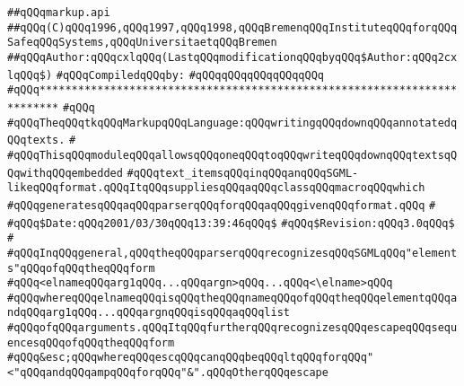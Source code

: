 \label{src/lib/tk/src/toolkit/markup.api}
\verb|##qQQqmarkup.api|\newline
\verb|##qQQq(C)qQQq1996,qQQq1997,qQQq1998,qQQqBremenqQQqInstituteqQQqforqQQqSafeqQQqSystems,qQQqUniversitaetqQQqBremen|\newline
\verb|##qQQqAuthor:qQQqcxlqQQq(LastqQQqmodificationqQQqbyqQQq$Author:qQQq2cxlqQQq$)|\newline
\newline
\verb|#qQQqCompiledqQQqby:|\newline
\verb|#qQQqqQQqqQQqqQQqqQQq|\newline
\newline
\newline
\newline
\newline
\verb|#qQQq*************************************************************************|\newline
\verb|#qQQq|\newline
\verb|#qQQqTheqQQqtkqQQqMarkupqQQqLanguage:qQQqwritingqQQqdownqQQqannotatedqQQqtexts.|\newline
\verb|#|\newline
\verb|#qQQqThisqQQqmoduleqQQqallowsqQQqoneqQQqtoqQQqwriteqQQqdownqQQqtextsqQQqwithqQQqembedded|\newline
\verb|#qQQqtext_itemsqQQqinqQQqanqQQqSGML-likeqQQqformat.qQQqItqQQqsuppliesqQQqaqQQqclassqQQqmacroqQQqwhich|\newline
\verb|#qQQqgeneratesqQQqaqQQqparserqQQqforqQQqaqQQqgivenqQQqformat.qQQq|\newline
\verb|#|\newline
\verb|#qQQq$Date:qQQq2001/03/30qQQq13:39:46qQQq$|\newline
\verb|#qQQq$Revision:qQQq3.0qQQq$|\newline
\verb|#|\newline
\verb|#qQQqInqQQqgeneral,qQQqtheqQQqparserqQQqrecognizesqQQqSGMLqQQq"elements"qQQqofqQQqtheqQQqform|\newline
\verb|#qQQq<elnameqQQqarg1qQQq...qQQqargn>qQQq...qQQq<\elname>qQQq|\newline
\verb|#qQQqwhereqQQqelnameqQQqisqQQqtheqQQqnameqQQqofqQQqtheqQQqelementqQQqandqQQqarg1qQQq...qQQqargnqQQqisqQQqaqQQqlist|\newline
\verb|#qQQqofqQQqarguments.qQQqItqQQqfurtherqQQqrecognizesqQQqescapeqQQqsequencesqQQqofqQQqtheqQQqform|\newline
\verb|#qQQq&esc;qQQqwhereqQQqescqQQqcanqQQqbeqQQqltqQQqforqQQq"<"qQQqandqQQqampqQQqforqQQq"&".qQQqOtherqQQqescape|\newline
